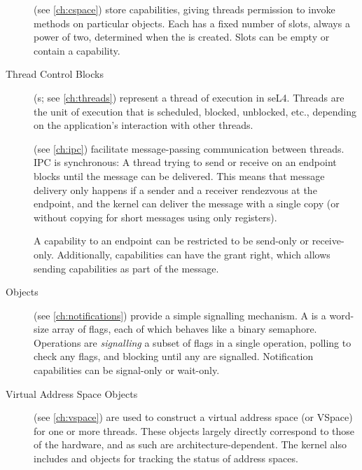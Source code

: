 \begin{description}

    \item[] (see \autoref{ch:cspace}) store capabilities, giving threads permission to
    invoke methods on particular objects.
    Each  has a fixed number of slots,
    always a power of two, determined when the  is created. Slots
    can be empty or contain a capability.

    \item[Thread Control Blocks] (s; see \autoref{ch:threads}) represent a thread of
    execution in seL4. Threads are the unit of execution that is
    scheduled, blocked, unblocked, etc., depending on the application's
    interaction with other threads.

    \item[] (see \autoref{ch:ipc}) facilitate message-passing
    communication between threads. IPC is synchronous: A thread
    trying to send or receive on an endpoint blocks until the message
    can be delivered. This means that message delivery only happens if
    a sender and a receiver rendezvous at the endpoint, and the
    kernel can deliver the message with a single copy (or without
    copying for short messages using only registers).

    A capability to an endpoint can be restricted to be
    send-only or receive-only. Additionally, 
    capabilities can have the grant right, which allows sending
    capabilities as part of the message.

    \item[ Objects] (see \autoref{ch:notifications})
      provide a simple signalling mechanism. A 
      is a word-size array of flags, each of which behaves like a binary semaphore. Operations
      are \emph{signalling} a subset of flags in a single operation,
      polling to check any flags, 
      and blocking until any are signalled. Notification capabilities
      can be signal-only or wait-only.

    \item[Virtual Address Space Objects] (see \autoref{ch:vspace}) 
    are used to construct a virtual
    address space (or VSpace) for one or more threads. These
    objects largely directly correspond to those of the hardware, and
    as such are architecture-dependent. The kernel also includes  and  objects for tracking the status of
    address spaces.


\end{description}
